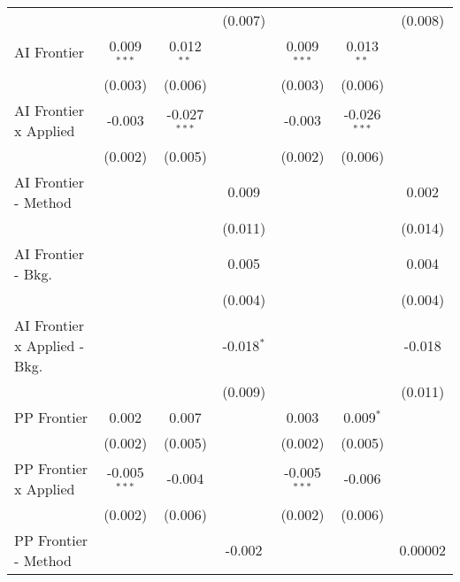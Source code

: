 \begin{tabular}{lcccccc}
                                  &                &                & (0.007)       &                &                & (0.008)\\   
   AI Frontier                    & 0.009$^{***}$  & 0.012$^{**}$   &               & 0.009$^{***}$  & 0.013$^{**}$   &   \\   
                                  & (0.003)        & (0.006)        &               & (0.003)        & (0.006)        &   \\   
   AI Frontier x Applied          & -0.003         & -0.027$^{***}$ &               & -0.003         & -0.026$^{***}$ &   \\   
                                  & (0.002)        & (0.005)        &               & (0.002)        & (0.006)        &   \\   
   AI Frontier - Method           &                &                & 0.009         &                &                & 0.002\\   
                                  &                &                & (0.011)       &                &                & (0.014)\\   
   AI Frontier - Bkg.             &                &                & 0.005         &                &                & 0.004\\   
                                  &                &                & (0.004)       &                &                & (0.004)\\   
   AI Frontier x Applied - Bkg.   &                &                & -0.018$^{*}$  &                &                & -0.018\\   
                                  &                &                & (0.009)       &                &                & (0.011)\\   
   PP Frontier                    & 0.002          & 0.007          &               & 0.003          & 0.009$^{*}$    &   \\   
                                  & (0.002)        & (0.005)        &               & (0.002)        & (0.005)        &   \\   
   PP Frontier x Applied          & -0.005$^{***}$ & -0.004         &               & -0.005$^{***}$ & -0.006         &   \\   
                                  & (0.002)        & (0.006)        &               & (0.002)        & (0.006)        &   \\   
   PP Frontier - Method           &                &                & -0.002        &                &                & 0.00002\\   

\end{tabular}
